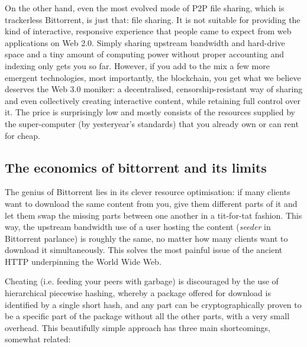 On the other hand, even the most evolved mode of P2P file sharing, which is trackerless Bittorrent, is just that: file sharing. It is not suitable for providing the kind of interactive, responsive experience that people came to expect from web applications on Web 2.0. Simply sharing upstream bandwidth and hard-drive space and a tiny amount of computing power without proper accounting and indexing only gets you so far. However, if you add to the mix a few more emergent technologies, most importantly, the blockchain, you get what we believe deserves the Web 3.0 moniker: a decentralised, censorship-resistant way of sharing and even collectively creating interactive content, while retaining full control over it. The price is surprisingly low and mostly consists of the resources supplied by the super-computer (by yesteryear's standards) that you already own or can rent for cheap.

\subsection{The economics of bittorrent and its limits}

The genius of Bittorrent lies in its clever resource optimisation: if many clients want to download the same content from you, give them different parts of it and let them swap the missing parts between one another in a tit-for-tat fashion. This way, the upstream bandwidth use of a user hosting the content (\emph{seeder} in Bittorrent parlance) is roughly the same, no matter how many clients want to download it simultaneously. This solves the most painful issue of the ancient HTTP underpinning the World Wide Web.

Cheating (i.e. feeding your peers with garbage) is discouraged by the use of hierarchical piecewise hashing, whereby a package offered for download is identified by a single short hash, and any part can be cryptographically proven to be a specific part of the package without all the other parts, with a very small overhead. This beautifully simple approach has three main shortcomings, somewhat related:

